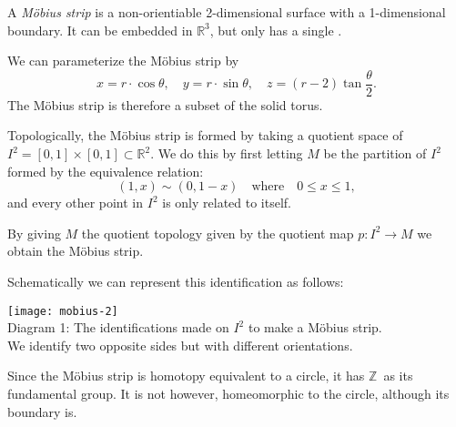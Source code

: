 \documentclass[12pt]{article}
\begin{document}
A \emph{M\"{o}bius strip} is a non-orientiable 2-dimensional surface with a 1-dimensional boundary. It can be embedded in $\mathbb{R}^3$, but only has a single .

We can parameterize the M\"{o}bius strip by
\[
x = r \cdot \cos{\theta}, \quad y = r \cdot \sin{\theta}, \quad z =
(r-2)\tan{\frac{\theta}{2}}.
\]
The M\"{o}bius strip is therefore a subset of the solid torus.

Topologically, the M\"{o}bius strip  is formed by taking a quotient space of $I^2 = [0,1] \times [0,1] \subset \mathbb{R}^2$. We do this by first letting $M$ be the partition of $I^2$ formed by the equivalence relation:
$$(1,x) \sim (0,1-x)\quad \mbox{where} \quad 0 \leq x \leq 1,$$ and every other point in $I^2$ is only related to itself.

By giving $M$ the quotient topology given by the quotient map $p: I^2 \to  M$ we obtain the M\"{o}bius strip.

Schematically we can represent this identification as follows:

\begin{center}
\texttt{[image: mobius-2]} \\
\tiny{Diagram 1: The identifications made on $I^2$ to make a M\"{o}bius strip. \\ We identify two opposite sides but with different orientations.}
\end{center}

Since the M\"{o}bius strip is homotopy equivalent to a circle, it has $\mathbb{Z}$\ as its fundamental group. It is not however, homeomorphic to the circle, although its boundary is.
\end{document}
